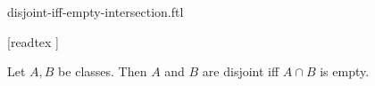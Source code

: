 \documentclass{stex}
\begin{document}
\begin{smodule}{disjoint-iff-empty-intersection.ftl}

  \begin{forthel}

    [readtex ]
  \end{forthel}

  \begin{forthel}
    \begin{proposition}
      Let $A, B$ be classes.
      Then $A$ and $B$ are disjoint iff $A \cap B$ is empty.
    \end{proposition}
  \end{forthel}
\end{smodule}
\end{document}
